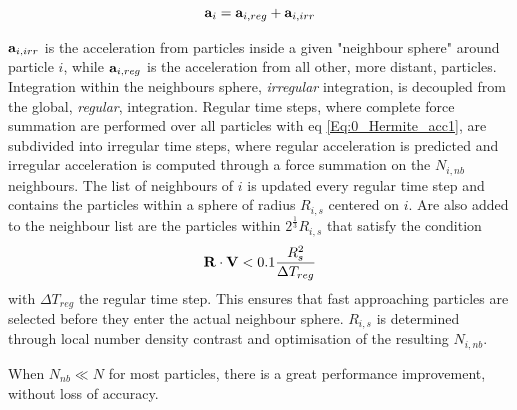\begin{equation}
\bold{a}_i = \bold{a}_{i,reg} + \bold{a}_{i,irr}
\end{equation}

$\bold{a}_{i,irr}$ is the acceleration from particles inside a given "neighbour sphere" around particle $i$, while $\bold{a}_{i,reg}$ is the acceleration from all other, more distant, particles. Integration within the neighbours sphere,  \textit{irregular} integration, is decoupled from the global, \textit{regular}, integration. Regular time steps, where complete force summation are performed over all particles with eq \ref{Eq:0_Hermite_acc1}, are subdivided into irregular time steps, where regular acceleration is predicted and irregular acceleration is computed through a force summation on the $N_{i,nb}$ neighbours. The list of neighbours of $i$ is updated every regular time step and contains the particles within a sphere of radius $R_{i,s}$ centered on $i$. Are also added to the neighbour list are the particles within $2^{\frac{1}{3}}R_{i,s} $ that satisfy the condition
\begin{equation}
\bold{R} \cdot \bold{V} < 0.1 \frac{R_s^2}{\Delta T_{reg}}
\end{equation}
with $\Delta T_{reg}$ the regular time step. This ensures that fast approaching particles are selected before they enter the actual neighbour sphere. $R_{i,s}$ is determined through local number density contrast and optimisation of the resulting $N_{i,nb}$. 

When $N_{nb} \ll N$ for most particles, there is a great performance improvement, without loss of accuracy. 












